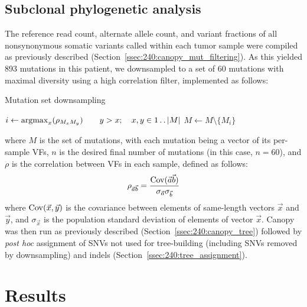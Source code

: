 \subsection{Subclonal phylogenetic analysis}
\label{ssec:303:phylo_analysis}
The reference read count, alternate allele count, and variant fractions of all nonsynonymous somatic variants called within each tumor sample were compiled as previously described (Section~\ref{ssec:240:canopy_mut_filtering}). As this yielded 893 mutations in this patient, we downsampled to a set of 60 mutations with maximal diversity using a high correlation filter, implemented as follows:
\begin{algorithm}[H]
    \caption{Mutation set downsampling}
    \label{alg:303:mutation_downsampling}
    \begin{algorithmic}[1]
            \State $i \gets \operatorname*{argmax}_x (\rho_{M_x M_y}) \qquad y > x; \quad x,y \in 1 \mathinner {\ldotp \ldotp} |M|$
            \State $M \gets M \setminus \{M_i\}$
        \EndWhile
    \end{algorithmic}
\end{algorithm}
\noindent where $M$ is the set of mutations, with each mutation being a vector of its per-sample VFs, $n$ is the desired final number of mutations (in this case, $n = 60$), and $\rho$ is the correlation between VFs in each sample, defined as follows:
\begin{equation}
    \rho_{\vec{a} \vec{b}} = \frac{\operatorname{Cov}(\vec{a} \vec{b})}{\sigma_{\vec{a}} \sigma_{\vec{b}}}
\end{equation}
where $\operatorname{Cov}(\vec{x}, \vec{y})$ is the covariance between elements of same-length vectors $\vec{x}$ and $\vec{y}$, and $\sigma_{\vec{x}}$ is the population standard deviation of elements of vector $\vec{x}$. Canopy was then run as previously described (Section~\ref{ssec:240:canopy_tree}) followed by \textit{post hoc} assignment of SNVs not used for tree-building (including SNVs removed by downsampling) and indels (Section~\ref{ssec:240:tree_assignment}).

\section{Results}

